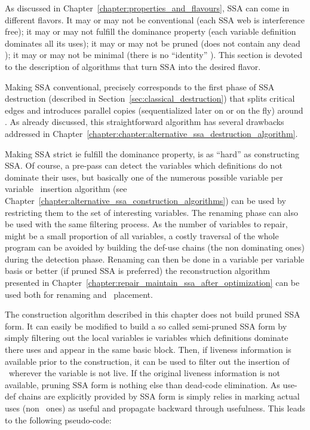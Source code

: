 As discussed in Chapter~\ref{chapter:properties_and_flavours}, SSA can come in different flavors. It may or may not be conventional (each SSA web is interference free); it may or may not fulfill the dominance property (each variable definition dominates all its uses); it may or may not be pruned (does not contain any dead \phiop); it may or may not be minimal (there is no ``identity'' \phiops).
This section is devoted to the description of algorithms that turn SSA into the desired flavor.

Making SSA conventional, precisely corresponds to the first phase of SSA destruction (described in Section~\ref{sec:classical_destruction}) that splits critical edges and introduces parallel copies (sequentialized later on or on the fly) around \phiops. As already discussed, this straightforward algorithm has several drawbacks addressed in Chapter~\ref{chapter:chapter:alternative_ssa_destruction_algorithm}.

Making SSA strict ie fulfill the dominance property, is as ``hard'' as constructing SSA. Of course, a pre-pass can detect the variables which definitions do not dominate their uses, but basically one of the numerous possible variable per variable \phiops\ insertion algorithm (see Chapter~\ref{chapter:alternative_ssa_construction_algorithms}) can be used by restricting them to the set of interesting variables. The renaming phase can also be used with the same filtering process. As the number of variables to repair, might be a small proportion of all variables, a costly traversal of the whole program can be avoided by building the def-use chains (the non dominating ones) during the detection phase. Renaming can then be done in a variable per variable basis or better (if pruned SSA is preferred) the reconstruction algorithm presented in Chapter~\ref{chapter:repair_maintain_ssa_after_optimization} can be used both for renaming and \phiops\ placement.

The construction algorithm described in this chapter does not build pruned SSA form. It can easily be modified to build a so called semi-pruned SSA form by simply filtering out the local variables ie variables which definitions dominate there uses and appear in the same basic block. Then, if liveness information is available prior to the construction, it can be used to filter out the insertion of \phiops\ wherever the variable is not live.
If the original liveness information is not available, pruning SSA form is nothing else than dead-code elimination. As use-def chains are explicitly provided by SSA form is simply relies in marking actual uses (non \phiops\ ones) as useful and propagate backward through \phiops usefulness. This leads to the following pseudo-code:

